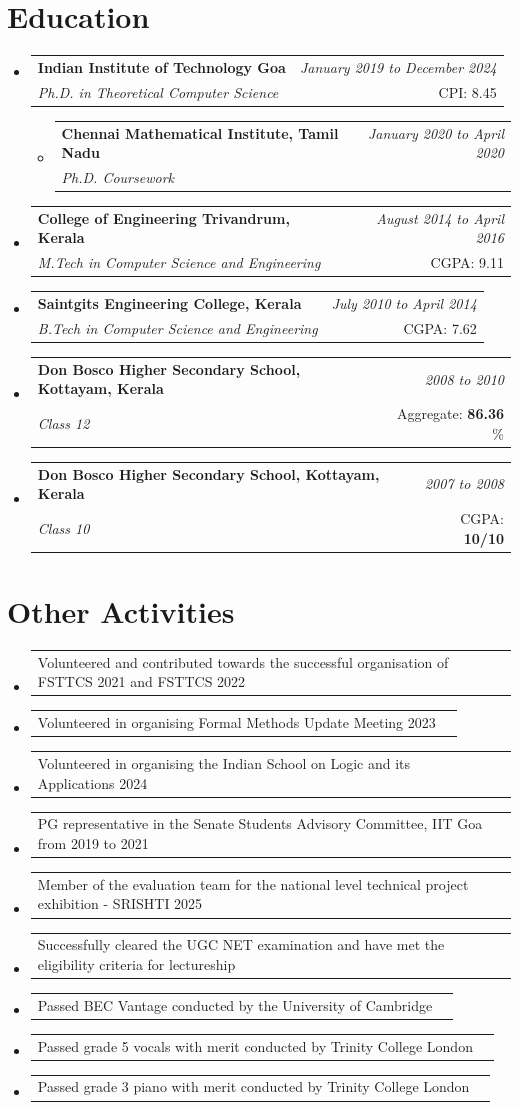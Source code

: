 \documentclass[a4paper,11pt]{article}
\makeatletter
\newcommand{\resumePoint}[2]{
\vspace{0.5mm}\item
    \begin{tabular*}{0.98\textwidth}[t]{l@{\extracolsep{\fill}}r}
        {\hspace{1mm}#1} & \textit{\footnotesize{#2}} \\
    \end{tabular*}
    \vspace{-2.4mm}
}
\newcommand{\resumeSubheading}[4]{
\vspace{0.5mm}\item
    \begin{tabular*}{0.98\textwidth}[t]{l@{\extracolsep{\fill}}r}
        \textbf{\hspace{1mm}#1} & \textit{\footnotesize{#4}} \\
        \textit{\footnotesize{#3}} &  \footnotesize{#2}\\
    \end{tabular*}
    \vspace{-2.4mm}
}
\newcommand{\resumeSubSubheading}[4]{
\begin{itemize}
\vspace{0.5mm}\item
    \begin{tabular*}{0.935\textwidth}[t]{l@{\extracolsep{\fill}}r}
        \textbf{#1} & \textit{\footnotesize{#4}} \\
        \textit{\footnotesize{#3}} &  \footnotesize{#2}\\
    \end{tabular*}
    \end{itemize}
    \vspace{-2.4mm}
}
\newcommand{\resumeSubHeadingListStart}{\begin{itemize}[leftmargin=*,labelsep=0mm]}
\newcommand{\resumeSubHeadingListEnd}{\end{itemize}\vspace{2mm}}
\makeatother
\begin{document}
\section{{\footnotesize \faUserGraduate}\textbf{ Education}}
  \resumeSubHeadingListStart
    \resumeSubheading
      {Indian Institute of Technology Goa}{CPI: 8.45}%
      {Ph.D. in Theoretical Computer Science}{ January 2019 to December 2024}
    \resumeSubSubheading
      {Chennai Mathematical Institute, Tamil Nadu}{}%
      {Ph.D. Coursework}{January 2020 to April 2020}
    \resumeSubheading
      {College of Engineering Trivandrum, Kerala}{CGPA: 9.11}%
      {M.Tech in Computer Science and Engineering}{August 2014 to April 2016}
       \resumeSubheading
      {Saintgits Engineering College, Kerala}{CGPA: 7.62}%
      {B.Tech in Computer Science and Engineering}{July 2010 to April 2014}
      \resumeSubheading
      {Don Bosco Higher Secondary School, Kottayam, Kerala}{Aggregate: \textbf{86.36} \%}
      {Class 12}{2008 to 2010}
      \resumeSubheading
      {Don Bosco Higher Secondary School, Kottayam, Kerala}{CGPA: \textbf{10/10} }
      {Class 10}{2007 to 2008}
  \resumeSubHeadingListEnd
  
 \vspace{-.45mm}
 \section{{\footnotesize \faMedal}\textbf{ Other Activities}}
  \resumeSubHeadingListStart
\resumePoint{Volunteered and contributed towards the successful organisation of FSTTCS 2021 and FSTTCS 2022}{}
\resumePoint{Volunteered in organising Formal Methods Update Meeting 2023}{}
\resumePoint{Volunteered in organising the Indian School on Logic and its Applications 2024}{}
    \resumePoint
{PG representative in the Senate Students Advisory Committee, IIT Goa from 2019 to 2021}{}
\resumePoint{Member of the evaluation team for the national level technical project exhibition - SRISHTI 2025}{}
\resumePoint{Successfully cleared the UGC NET examination and have met the eligibility criteria for lectureship}{}%
\resumePoint{Passed BEC Vantage conducted by the University of Cambridge}{}
\resumePoint{Passed grade 5 vocals with merit conducted by Trinity College London}{}
\resumePoint{Passed grade 3 piano with merit conducted by Trinity College London}{}
 \resumeSubHeadingListEnd
 
\end{document}
